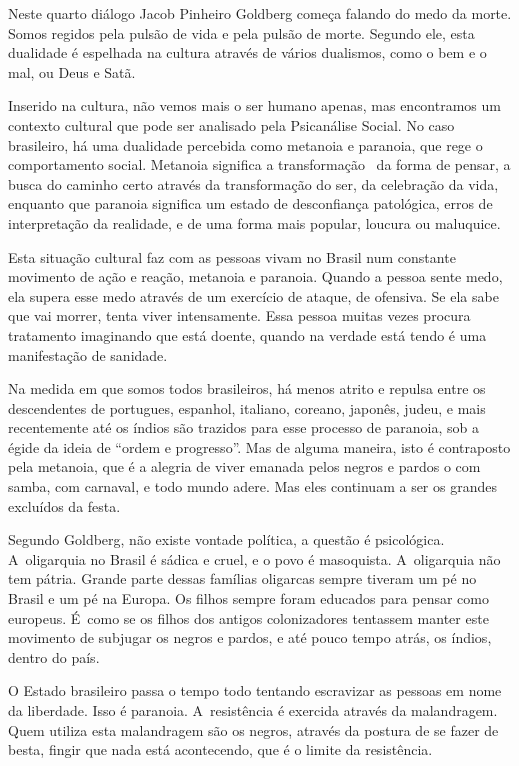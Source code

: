  

Neste quarto diálogo Jacob Pinheiro Goldberg começa falando do medo da
morte. Somos regidos pela pulsão de vida e pela pulsão de morte. Segundo
ele, esta dualidade é espelhada na cultura através de vários dualismos,
como o bem e o mal, ou Deus e Satã.

Inserido na cultura, não vemos mais o ser humano apenas, mas encontramos
um contexto cultural que pode ser analisado pela Psicanálise Social. No
caso brasileiro, há uma dualidade percebida como metanoia e paranoia,
que rege o comportamento social. Metanoia significa a transformação~ da
forma de pensar, a busca do caminho certo através da transformação do
ser, da celebração da vida, enquanto que paranoia significa um estado de
desconfiança patológica, erros de interpretação da realidade, e de uma
forma mais popular, loucura ou maluquice.

Esta situação cultural faz com as pessoas vivam no Brasil num constante
movimento de ação e reação, metanoia e paranoia. Quando a pessoa sente
medo, ela supera esse medo através de um exercício de ataque, de
ofensiva. Se ela sabe que vai morrer, tenta viver intensamente. Essa
pessoa muitas vezes procura tratamento imaginando que está doente,
quando na verdade está tendo é uma manifestação de sanidade.

Na medida em que somos todos brasileiros, há menos atrito e repulsa
entre os descendentes de portugues, espanhol, italiano, coreano,
japonês, judeu, e mais recentemente até os índios são trazidos para esse
processo de paranoia, sob a égide da ideia de ``ordem e progresso''. Mas
de alguma maneira, isto é contraposto pela metanoia, que é a alegria de
viver emanada pelos negros e pardos o com samba, com carnaval, e todo
mundo adere. Mas eles continuam a ser os grandes excluídos da festa.

Segundo Goldberg, não existe vontade política, a questão é psicológica.
A~oligarquia no Brasil é sádica e cruel, e o povo é masoquista. A~oligarquia não tem pátria. Grande parte dessas famílias oligarcas sempre
tiveram um pé no Brasil e um pé na Europa. Os filhos sempre foram
educados para pensar como europeus. É~como se os filhos dos antigos
colonizadores tentassem manter este movimento de subjugar os negros e
pardos, e até pouco tempo atrás, os índios, dentro do país.

O Estado brasileiro passa o tempo todo tentando escravizar as pessoas em
nome da liberdade. Isso é paranoia. A~resistência é exercida através da
malandragem. Quem utiliza esta malandragem são os negros, através da
postura de se fazer de besta, fingir que nada está acontecendo, que é o
limite da resistência.

